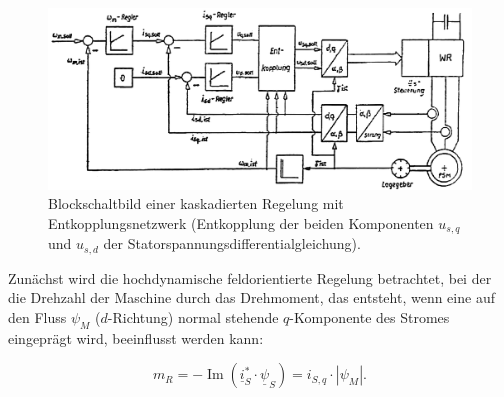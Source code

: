 \begin{figure}[h!]
    \centering
    \includegraphics[scale=0.4]{1/Regelung.png}
    \caption{Blockschaltbild einer kaskadierten Regelung mit Entkopplungsnetzwerk (Entkopplung der beiden Komponenten $u_{s,q}$ und $u_{s,d}$ der Statorspannungsdifferentialgleichung).}
    \label{fig:regelkreis}
\end{figure}

\noindent Zunächst wird die hochdynamische feldorientierte Regelung betrachtet, bei der die Drehzahl der Maschine durch das Drehmoment, das entsteht, wenn eine auf den Fluss $\psi_M$ ($d$-Richtung) normal stehende $q$-Komponente des Stromes eingeprägt wird, beeinflusst werden kann:

\begin{equation}
    m_R=-\operatorname{Im}(\underline{i}_S^* \cdot \underline{\psi}_S)= i_{S,q} \cdot |\psi_M|.
\end{equation}

